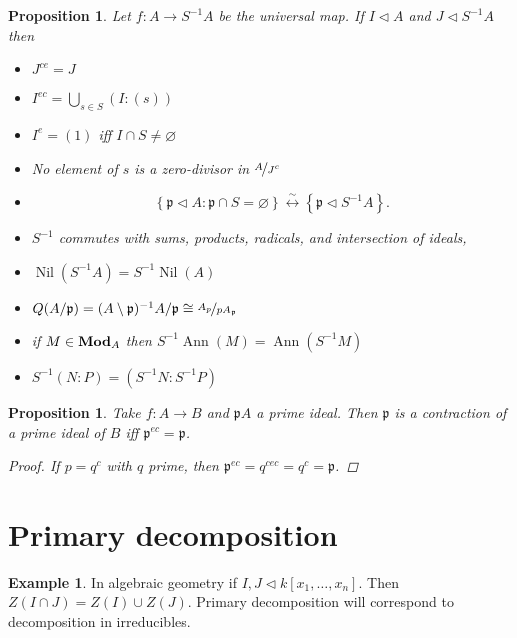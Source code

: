 \documentclass{article}
\DeclareMathOperator{\modules}{{\bf Mod}}
\newcommand{\set}[1]{\left\{#1\right\}}
\newcommand{\setwith}[2]{\left\{#1:#2\right\}}
\DeclareMathOperator{\Nil}{Nil}
\DeclareMathOperator{\Ann}{Ann}
\newcommand{\primeid}{\mathfrak{p}}
\newcommand{\ideal}{\triangleleft}
\newtheorem{proposition}[theorem]{Proposition}
\theoremstyle{definition}
\newtheorem{example}[theorem]{Example}
\begin{document}
\begin{proposition}
    Let \(f:A\to S^{-1}A\) be the universal map. If \(I\ideal A\) and \(J\ideal
    S^{-1}A\) then
    \begin{itemize}
        \item \(J^{ce}=J\)
        \item \(I^{ec}=\bigcup_{s\in S}(I:(s))\)
        \item \(I^{e}=(1)\) iff \(I\cap S\neq\varnothing\)
        \item No element of \(s\) is a zero-divisor in \(\nicefrac{A}{J^{c}}\)
        \item
              \[
                  \setwith{\primeid\ideal A}{\primeid\cap S=\varnothing}\overset{\sim}{\leftrightarrow}\set{\primeid\ideal S^{-1}A}.
              \]

        \item \(S^{-1}\) commutes with sums, products, radicals, and
              intersection of ideals,
        \item \(\Nil(S^{-1}A)=S^{-1}\Nil(A)\)
        \item \(Q(A/\primeid)=(A\setminus\primeid)^{-1}A/\primeid\cong\nicefrac{A_{p}}{pA_{\primeid}}\)
        \item if \(M\in\modules_{A}\) then \(S^{-1}\Ann(M)=\Ann(S^{-1}M)\)
        \item \(S^{-1}(N:P)=(S^{-1}N:S^{-1}P)\)
    \end{itemize}
\end{proposition}

\begin{proposition}
    Take \(f:A\to B\) and \(\primeid A\) a prime ideal. Then \(\primeid\) is a
    contraction of a prime ideal of \(B\) iff \(\primeid^{ec}=\primeid\).

    \begin{proof}
        If \(p=q^{c}\) with \(q\) prime, then
        \(\primeid^{ec}=q^{cec}=q^{c}=\primeid\).
    \end{proof}
\end{proposition}

\section{Primary decomposition}

\begin{example}
    In algebraic geometry if \(I,J\ideal k[x_{1},\ldots,x_{n}]\). Then \(Z(I\cap
    J)=Z(I)\cup Z(J)\). Primary decomposition will correspond to decomposition
    in irreducibles.
\end{example}
\end{document}

